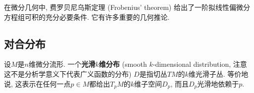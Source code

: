 
在微分几何中, 费罗贝尼乌斯定理 (Frobenius' theorem) 给出了一阶拟线性偏微分方程组可积的充分必要条件. 它有许多重要的几何推论.

\subsection{对合分布}
设$M$是$n$维微分流形. 一个\textbf{光滑$k$维分布} (smooth $k$-dimensional distribution, 注意这不是分析学意义下代表广义函数的分布) $D$是指切丛$TM$的$k$维光滑子丛. 等价地说, 这表示在任何一点$p\in M$都给出$T_pM$的$k$维子空间$D_p$, 而且$D_p$光滑地依赖于$p$.